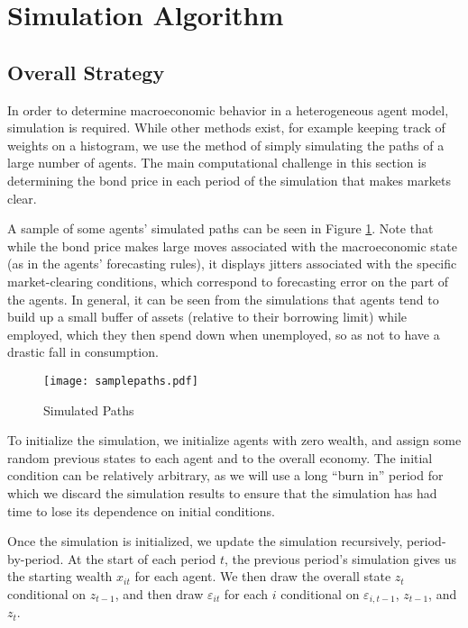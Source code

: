 \documentclass[a4paper,12pt]{article}
\newcommand{\eps}{\varepsilon}
\numberwithin{equation}{section}
\theoremstyle{definition}
\begin{document}
\section{Simulation Algorithm}
\label{sec:simulation-algorithm}

\subsection{Overall Strategy}

In order to determine macroeconomic behavior in a heterogeneous agent
model, simulation is required. While other methods exist, for example
keeping track of weights on a histogram, we use the method of simply
simulating the paths of a large number of agents. The main
computational challenge in this section is determining the bond price
in each period of the simulation that makes markets clear.

A sample of some agents' simulated paths can be seen in Figure
\ref{fig:sim-paths}. Note that while the bond price makes large
moves associated with the macroeconomic state (as in the agents'
forecasting rules), it displays jitters associated with the specific
market-clearing conditions, which correspond to forecasting error on
the part of the agents. In general, it can be seen from the
simulations that agents tend to build up a small buffer of assets
(relative to their borrowing limit) while employed, which they then
spend down when unemployed, so as not to have a drastic fall in
consumption.

\begin{figure}[ht]
  \centering
  \caption{Simulated Paths}
  \label{fig:sim-paths}
  \texttt{[image: samplepaths.pdf]}
\end{figure}

To initialize the simulation, we initialize agents with zero wealth,
and assign some random previous states to each agent and to the
overall economy. The initial condition can be relatively arbitrary, as
we will use a long ``burn in'' period for which we discard the
simulation results to ensure that the simulation has had time to lose
its dependence on initial conditions.

Once the simulation is initialized, we update the simulation
recursively, period-by-period. At the start of each period $t$, the
previous period's simulation gives us the starting wealth $x_{it}$ for
each agent. We then draw the overall state $z_t$ conditional on
$z_{t-1}$, and then draw $\eps_{it}$ for each $i$ conditional on
$\eps_{i,t-1}$, $z_{t-1}$, and $z_t$.
\end{document}
